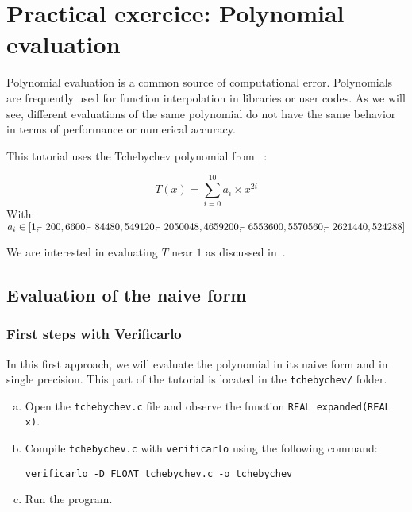 \section{Practical exercice: Polynomial evaluation}

Polynomial evaluation is a common source of computational error. Polynomials are frequently used for function interpolation in libraries or user codes. As we will see, different evaluations of the same polynomial do not have the same behavior in terms of performance or numerical accuracy.

This tutorial uses the Tchebychev polynomial from ~\cite[pp.52-54]{parker1997monte}:

$$T(x)=\sum_{i=0}^{10}{a_i \times x^{2i}}$$
With:
$a_i \in [
  1,
  \matminus 200,
  6600,
  \matminus 84480,
  549120,
  \matminus 2050048,
  4659200,
  \matminus 6553600,
  5570560,
  \matminus 2621440,
  524288
]$

We are interested in evaluating  $T$ near $1$ as discussed in~\cite[pp.52-54]{parker1997monte}.

\subsection{Evaluation of the naive form}

\subsubsection{First steps with Verificarlo}

In this first approach, we will evaluate the polynomial in its naive form and in single precision. This part of the tutorial is located in the \texttt{tchebychev/} folder.

\begin{question}
  \begin{enumerate}[(a)]
  \item Open the {\tt tchebychev.c} file and observe the function {\tt REAL expanded(REAL x)}.

  \item Compile {\tt tchebychev.c} with {\tt verificarlo} using the following command:
\begin{verbatim}
verificarlo -D FLOAT tchebychev.c -o tchebychev
\end{verbatim}
  \item Run the program.
  \end{enumerate}
\end{question}

